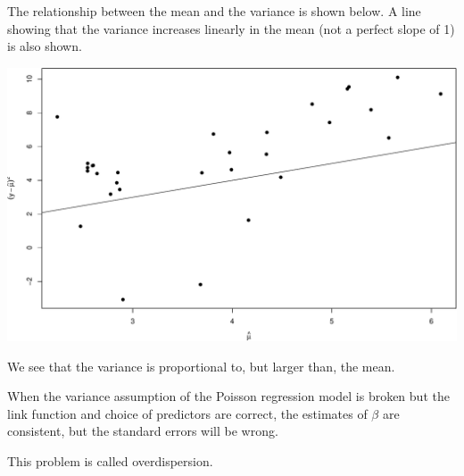 \documentclass[
  ignorenonframetext,
]{beamer}
\newenvironment{Shaded}{\begin{snugshade}}{\end{snugshade}}
\newcommand{\AttributeTok}[1]{\textcolor[rgb]{0.77,0.63,0.00}{#1}}
\newcommand{\DecValTok}[1]{\textcolor[rgb]{0.00,0.00,0.81}{#1}}
\newcommand{\FunctionTok}[1]{\textcolor[rgb]{0.00,0.00,0.00}{#1}}
\newcommand{\NormalTok}[1]{#1}
\newcommand{\SpecialCharTok}[1]{\textcolor[rgb]{0.00,0.00,0.00}{#1}}
\begin{document}
\begin{frame}[fragile]{}
\protect\hypertarget{section-21}{}
\small

The relationship between the mean and the variance is shown below. A
line showing that the variance increases linearly in the mean (not a
perfect slope of 1) is also shown.

\vspace{12pt}
\tiny

\begin{Shaded}
\end{Shaded}

\includegraphics{week4_p2_files/figure-beamer/unnamed-chunk-20-1.pdf}
\end{frame}

\begin{frame}{}
\protect\hypertarget{section-22}{}
We see that the variance is proportional to, but larger than, the mean.

\vspace{12pt}

When the variance assumption of the Poisson regression model is broken
but the link function and choice of predictors are correct, the
estimates of \(\beta\) are consistent, but the standard errors will be
wrong.

\vspace{12pt}

This problem is called overdispersion.
\end{frame}
\end{document}
